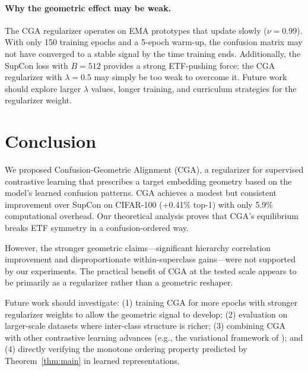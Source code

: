 \documentclass{article}
\begin{document}
\paragraph{Why the geometric effect may be weak.}
The CGA regularizer operates on EMA prototypes that update slowly ($\nu=0.99$). With only 150 training epochs and a 5-epoch warm-up, the confusion matrix may not have converged to a stable signal by the time training ends. Additionally, the SupCon loss with $B=512$ provides a strong ETF-pushing force; the CGA regularizer with $\lambda=0.5$ may simply be too weak to overcome it. Future work should explore larger $\lambda$ values, longer training, and curriculum strategies for the regularizer weight.

\section{Conclusion}
\label{sec:conclusion}

We proposed Confusion-Geometric Alignment (CGA), a regularizer for supervised contrastive learning that prescribes a target embedding geometry based on the model's learned confusion patterns. CGA achieves a modest but consistent improvement over SupCon on CIFAR-100 (+0.41\% top-1) with only 5.9\% computational overhead. Our theoretical analysis proves that CGA's equilibrium breaks ETF symmetry in a confusion-ordered way.

However, the stronger geometric claims---significant hierarchy correlation improvement and disproportionate within-superclass gains---were not supported by our experiments. The practical benefit of CGA at the tested scale appears to be primarily as a regularizer rather than a geometric reshaper.

Future work should investigate: (1) training CGA for more epochs with stronger regularizer weights to allow the geometric signal to develop; (2) evaluation on larger-scale datasets where inter-class structure is richer; (3) combining CGA with other contrastive learning advances (e.g., the variational framework of \citet{wang2025variational}); and (4) directly verifying the monotone ordering property predicted by Theorem~\ref{thm:main} in learned representations.



\end{document}
